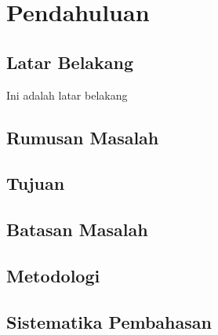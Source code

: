 \chapter{Pendahuluan}

\section{Latar Belakang}
\label{sec:latarbelakang}
Ini adalah latar belakang

\section{Rumusan Masalah}

\section{Tujuan}

\section{Batasan Masalah}

\section{Metodologi}

\section{Sistematika Pembahasan}
